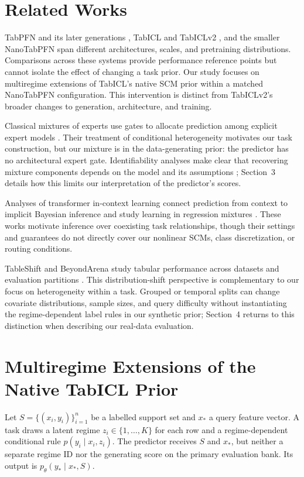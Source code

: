 \documentclass{article}
\begin{document}
\section{Related Works}
TabPFN and its later generations \citep{hollmann2023tabpfn,hollmann2025tabpfn,grinsztajn2026tabpfn3}, TabICL and TabICLv2 \citep{qu2025tabicl,qu2026tabiclv2}, and the smaller NanoTabPFN \citep{pfefferle2025nanotabpfn} span different architectures, scales, and pretraining distributions. Comparisons across these systems provide performance reference points but cannot isolate the effect of changing a task prior. Our study focuses on multiregime extensions of TabICL's native SCM prior within a matched NanoTabPFN configuration. This intervention is distinct from TabICLv2's broader changes to generation, architecture, and training.

Classical mixtures of experts use gates to allocate prediction among explicit expert models \citep{jacobs1991experts,jordan1994hierarchical}. Their treatment of conditional heterogeneity motivates our task construction, but our mixture is in the data-generating prior: the predictor has no architectural expert gate. Identifiability analyses make clear that recovering mixture components depends on the model and its assumptions \citep{jiang1999identifiability}; Section~3 details how this limits our interpretation of the predictor's scores.

Analyses of transformer in-context learning connect prediction from context to implicit Bayesian inference \citep{xie2022implicit} and study learning in regression mixtures \citep{pathak2024mixtures,jin2025mixtures}. These works motivate inference over coexisting task relationships, though their settings and guarantees do not directly cover our nonlinear SCMs, class discretization, or routing conditions.

TableShift and BeyondArena study tabular performance across datasets and evaluation partitions \citep{gardner2023tableshift,purucker2026beyondarena}. This distribution-shift perspective is complementary to our focus on heterogeneity within a task. Grouped or temporal splits can change covariate distributions, sample sizes, and query difficulty without instantiating the regime-dependent label rules in our synthetic prior; Section~4 returns to this distinction when describing our real-data evaluation.

\section{Multiregime Extensions of the Native TabICL Prior}
Let $S=\{(x_i,y_i)\}_{i=1}^{n}$ be a labelled support set and $x_*$ a query feature vector. A task draws a latent regime $z_i\in\{1,\ldots,K\}$ for each row and a regime-dependent conditional rule $p(y_i\mid x_i,z_i)$. The predictor receives $S$ and $x_*$, but neither a separate regime ID nor the generating score on the primary evaluation bank. Its output is $p_\theta(y_*\mid x_*,S)$.
\end{document}
